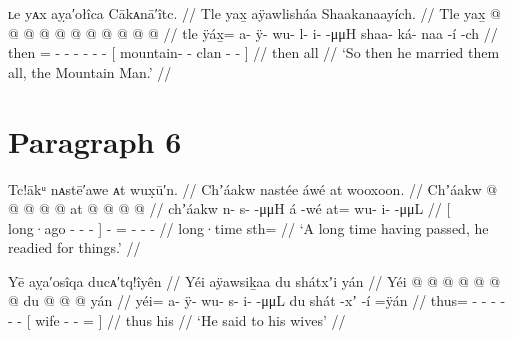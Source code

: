 \ex\label{ex:92-122-married-them-all}%
%
\begingl
	\glpreamble	ʟe yᴀx aỵa′ołîca Cākᴀnā′îtc. //
	\glpreamble	Tle yax̱ aÿawlisháa Shaakanaayích. //
	\gla	Tle yax̱ @  @ {} @ {} @ {} @ {} @ {} @ {}
		{}  @ {} @ {} @ {} @ {} {} //
	\glb	tle ÿáx̱= a- ÿ- wu- l- i-  -μμH
		{} shaa- ká- naa -í -ch {} //
	\glc	then = - - - - -
			 -
		{}[ mountain- - clan - - {}] //
	\gld	then all  {} {} {} {} {} {}
		{}  {} {} {} {} {} //
	\glft	‘So then he married them all, the Mountain Man.’
		//
\endgl
\xe

\section{Paragraph 6}\label{sec:92-para-6}

\ex\label{ex:92-123-ready-for-things}%
%
\begingl
	\glpreamble	Tc!ākᵘ nᴀstē′awe ᴀt wux̣ū′n. //
	\glpreamble	Chʼáakw nastée áwé at wooxoon. //
	\gla	{} Chʼáakw  @ {} @ {} @ {} @ {} {}  @ {}
		at @  @ {} @ {} @ {} //
	\glb	{} chʼáakw n- s-  -μμH {} {} á -wé
		at= wu- i-  -μμL //
	\glc	{}[ long·ago - -  - \· {}]
		 -
		= - -  - //
	\gld	{} long·time  {} {} {} {} {}
		 {} 
 		sth=  {} {} {} //
	\glft	‘A long time having passed, he readied for things.’
		//
\endgl
\xe


\ex\label{ex:92-124-said-to-wives}%
%
\begingl
	\glpreamble	Yē aỵa′osîqa ducᴀ′tq!îyên //
	\glpreamble	Yéi aÿawsiḵaa du shátxʼi yán //
	\gla	Yéi @  @ {} @ {} @ {} @ {} @ {} @ {}
		{} du  @ {} @ {} @ \•yán {} //
	\glb	yéi= a- ÿ- wu- s- i-  -μμL
		{} du shát -xʼ -í =ÿán {} //
	\glc	thus= - - - - -  -
		{}[  wife - - = {}] //
	\gld	thus  {} {} {} {} {} {}
		{} his  {} {} {} {} //
	\glft	‘He said to his wives’
		//
\endgl
\xe

